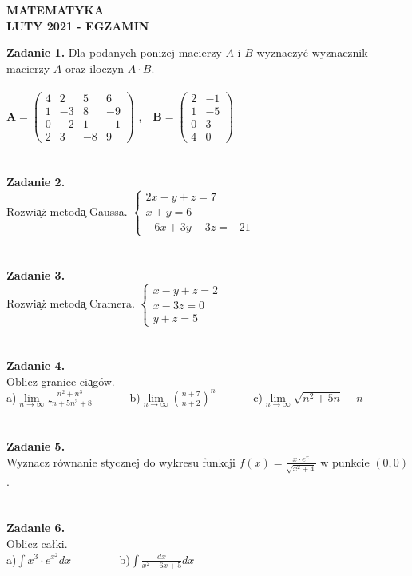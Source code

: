 \documentclass{report}
\begin{document}
\begin{center}
\textbf{MATEMATYKA \\LUTY 2021 - EGZAMIN}
\end{center}
\textbf{Zadanie 1.} 
Dla podanych poniżej macierzy $A$ i $B$ wyznaczyć wyznacznik macierzy $A$ oraz iloczyn $A\cdot B$.
\\\\
$
\mathbf{A} =
\left( \begin{array}{cccc}
4 & 2& 5 & 6\\
1 & -3& 8 & -9\\
0 & -2& 1 & -1\\
2 & 3 & -8 & 9 
\end{array} \right)
$ ,\ \ 
$
\mathbf{B} =
\left( \begin{array}{cccc}
2 & -1\\
1 & -5\\
0 & 3\\
4 & 0  
\end{array} \right)
$
\\\\\\\textbf{Zadanie 2.} 
\\Rozwi\c{a}\.z metod\c{a} Gaussa. 
$
\left\{ \begin{array}{ll}
2x-y+z=7\\
x+y=6\\
-6x+3y-3z=-21
\end{array} \right.
$
\\\\\\\textbf{Zadanie 3.} 
\\Rozwi\c{a}\.z metod\c{a} Cramera. 
$
\left\{ \begin{array}{ll}
x-y+z=2\\
x-3z=0\\
y+z=5
\end{array} \right.
$
\\\\\\\textbf{Zadanie 4.}
\\Oblicz granice ci\c{a}g\'ow.
\\a)$\lim\limits_{n\to\infty}\frac{n^2+n^3}{7n+5n^3+8}$
\ \ \ \ \ \  b)$\lim\limits_{n\to \infty}(\frac{n+7}{n+2})^n$
\ \ \ \ \ \ c)$\lim\limits_{n\to\infty} \sqrt{n^2+5n}-n$
\\\\\\\textbf{Zadanie 5.}
\\Wyznacz równanie stycznej do wykresu funkcji $f(x)=\frac{x\cdot e^x}{\sqrt{x^2+4}}$ w punkcie $(0,0)$. 
\\\\\\\textbf{Zadanie 6.}
\\Oblicz całki. 
\\a)$\int x^3\cdot e^{x^2} dx$ \ \ \ \ \ \ \ \ b)$\int \frac{dx}{x^2-6x+5} dx$
\end{document}

